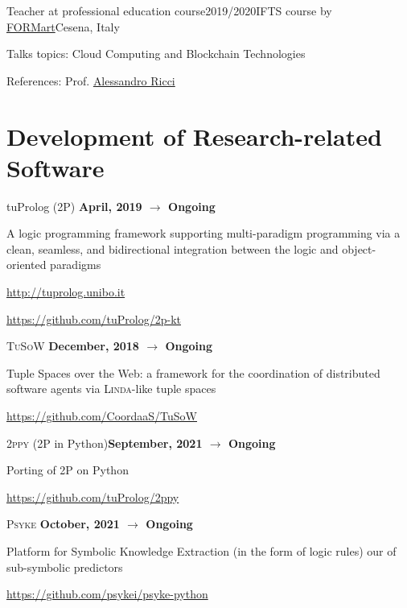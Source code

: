 \begin{activity}{Teacher at professional education course}{2019/2020}{IFTS course by \href{http://www.formart.it/home}{FORMart}}{Cesena, Italy}
    \item Talks topics: Cloud Computing and Blockchain Technologies
    \item References:  Prof. \href{mailto:a.ricci@unibo.it}{Alessandro Ricci}
\end{activity}


\section*{Development of Research-related Software}

\begin{activity}{\textsf{tu}Prolog (2P) \cite{cco-softwarex-2021-2pkt}}{\textbf{April, 2019 $\rightarrow$ Ongoing}}{}{}
    \item A logic programming framework supporting multi-paradigm programming via a clean, seamless, and bidirectional integration between the logic and object-oriented paradigms
    \item \url{http://tuprolog.unibo.it}
    \item \url{https://github.com/tuProlog/2p-kt}
\end{activity}

\begin{activity}{\textsc{TuSoW} \cite{tusow-icccn2019}}{\textbf{December, 2018 $\rightarrow$ Ongoing}}{}{}
    \item Tuple Spaces over the Web: a framework for the coordination of distributed software agents via \textsc{Linda}-like tuple spaces
    \item \url{https://github.com/CoordaaS/TuSoW}
\end{activity}

\begin{activity}{\textsc{2ppy} (2P in Python)}{\textbf{September, 2021 $\rightarrow$ Ongoing}}{}{}
    \item Porting of 2P on Python
    \item \url{https://github.com/tuProlog/2ppy}
\end{activity}

\begin{activity}{\textsc{Psyke} \cite{psyke-woa2021}}{\textbf{October, 2021 $\rightarrow$ Ongoing}}{}{}
    \item Platform for Symbolic Knowledge Extraction (in the form of logic rules) our of sub-symbolic predictors
    \item \url{https://github.com/psykei/psyke-python}
\end{activity}
